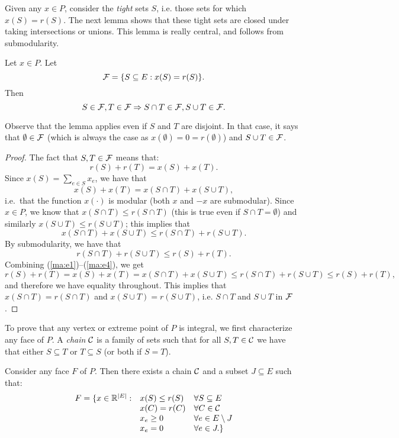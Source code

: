 \documentclass[12pt]{article}
\begin{document}
Given any $x\in P$, consider the {\it tight} sets $S$, i.e. those sets
for which $x(S)=r(S)$. The next lemma shows that these tight sets are
closed under taking intersections or unions. This lemma is really
central, and follows from submodularity.

\begin{lemma} \label{uncross}
Let $x\in P$. Let $${\cal F}=\{S\subseteq E: x(S)=r(S)\}.$$
Then $$S\in {\cal F}, T\in {\cal F} \Rightarrow S\cap T\in {\cal F},
S\cup T\in {\cal F}.$$
\end{lemma}
Observe that the lemma applies even if $S$ and $T$ are disjoint. In
that case, it says that $\emptyset\in {\cal F}$ (which is always the
case as $x(\emptyset)=0=r(\emptyset)$) and $S\cup T\in {\cal F}$. 

\begin{proof}
The fact that $S, T\in {\cal F}$ means that:
\begin{equation} \label{ma:e1}
r(S) + r(T)= x(S) + x(T).
\end{equation}
Since $x(S)=\sum_{e\in S} x_e$, we have that 
\begin{equation} \label{ma:e2}
x(S)+x(T) = x(S\cap T) + x(S \cup T),
\end{equation}
i.e.\ that the function
$x(\cdot)$ is modular (both $x$ and $-x$ are submodular).
Since $x\in P$, we know that $x(S\cap T) \leq r(S \cap T)$ (this is
true even if $S\cap T=\emptyset$) and
similarly $x(S \cup T) \leq r(S\cup T)$; this implies that 
\begin{equation} \label{ma:e3}
x(S\cap T) + x(S\cup T) \leq r(S\cap T) + r(S\cup T).
\end{equation}
By submodularity, we have that   
\begin{equation} \label{ma:e4}
r(S\cap T) + r(S\cup T) \leq r(S) + r(T).
\end{equation}
Combining (\ref{ma:e1})--(\ref{ma:e4}), we get 
$$r(S) + r(T)= x(S) + x(T) = x(S\cap T) + x(S \cup T)  \leq r(S\cap T)
+ r(S\cup T)  \leq r(S) + r(T),$$
and therefore we have equality throughout. This implies that $x(S\cap
T)=r(S\cap T)$ and $x(S\cup T) =r(S\cup T)$, i.e. $S\cap T$ and $S\cup
T$ in ${\cal F}$.  
\end{proof}

To prove that any vertex or extreme point of $P$ is integral, we first
characterize any face of $P$. A {\it chain} ${\cal C}$ is a
family of sets such that for all $S, T\in {\cal C}$ we have that
either $S\subseteq T$ or $T\subseteq S$ (or both if $S=T$). 
\begin{theorem}
Consider any face $F$ of $P$. Then there exists a chain ${\cal C}$ and
a subset $J\subseteq E$ such that:
$$\begin{array}{rll} 
F = \{x\in {\mathbb R}^{|E|}: & x(S) \leq r(S) & \forall S\subseteq E \\
& x(C) =r(C) & \forall C\in {\cal C} \\
& x_e \geq 0 & \forall e\in E\setminus J \\
& x_e = 0 & \forall e\in J.\}
\end{array}$$
\end{theorem}
\end{document}
